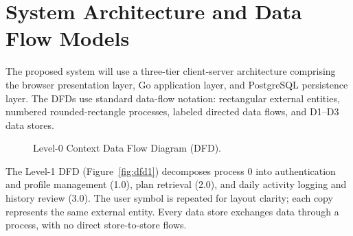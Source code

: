 \documentclass[11pt,a4paper]{report}
\begin{document}
\section{System Architecture and Data Flow Models}
The proposed system will use a three-tier client-server architecture comprising the browser presentation layer, Go application layer, and PostgreSQL persistence layer. The DFDs use standard data-flow notation: rectangular external entities, numbered rounded-rectangle processes, labeled directed data flows, and D1--D3 data stores.

\begin{figure}[htbp]
\centering
{}
\caption{Level-0 Context Data Flow Diagram (DFD).}
\label{fig:dfd0}
\end{figure}

The Level-1 DFD (Figure~\ref{fig:dfd1}) decomposes process 0 into authentication and profile management (1.0), plan retrieval (2.0), and daily activity logging and history review (3.0). The user symbol is repeated for layout clarity; each copy represents the same external entity. Every data store exchanges data through a process, with no direct store-to-store flows.
\end{document}
